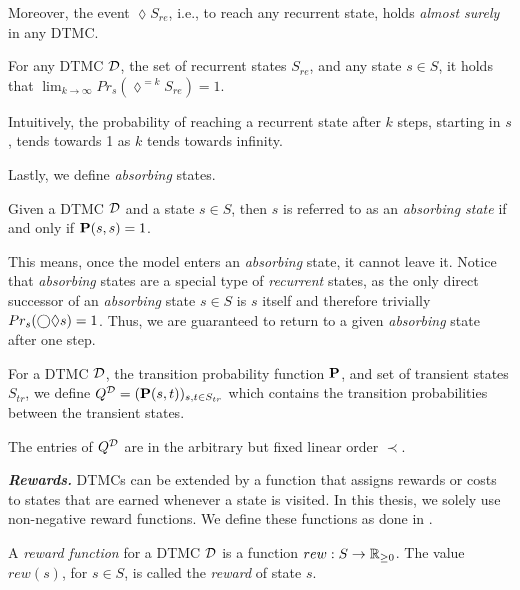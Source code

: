 Moreover, the event $\lozenge S_{re}$, i.e., to reach any recurrent state, holds \textit{almost surely} in any DTMC.

\begin{theorem}
    For any DTMC $\mathcal{D}$, the set of recurrent states $S_{re}$, and any state $s\in S$, it holds that $\lim_{k\rightarrow\infty}Pr_s(\lozenge^{=k} S_{re})=1$.
\end{theorem}
Intuitively, the probability of reaching a recurrent state after $k$ steps, starting in $s$, tends towards 1 as $k$ tends towards infinity.

Lastly, we define \textit{absorbing} states.
\begin{definition}
    Given a DTMC $\mathcal{D}$ and a state $s\in S$, then $s$ is referred to as an \textit{absorbing state} if and only if $\mathbf{P}(s,s) = 1$.
\end{definition}
This means, once the model enters an \textit{absorbing} state, it cannot leave it. Notice that \textit{absorbing} states are a special type of \textit{recurrent} states, as the only direct successor of an \textit{absorbing} state $s\in S$ is $s$ itself and therefore trivially $Pr_s(\bigcirc\lozenge s)=1$. Thus, we are guaranteed to return to a given \textit{absorbing} state after one step.

\begin{definition}\label{def:canonical_form}
    For a DTMC $\mathcal{D}$, the transition probability function $\mathbf{P}$, and set of transient states $S_{tr}$, we define $Q^{\mathcal{D}} = (\mathbf{P}(s,t))_{s,t\in S_{tr}}$ which contains the transition probabilities between the transient states.
\end{definition}
The entries of $Q^{\mathcal{D}}$ are in the arbitrary but fixed linear order $\prec$. 

\emph{\textbf{Rewards.}} DTMCs can be extended by a function that assigns rewards or costs to states that are earned whenever a state is visited. In this thesis, we solely use non-negative reward functions. We define these functions as done in \cite{Computing_EVTs_Stationary_Distr_in_MCs_Mertens}.

\begin{definition}
    A \textit{reward function} for a DTMC $\mathcal{D}$ is a function $rew: S\rightarrow\mathbb{R}_{\geq 0}$. The value $rew(s)$, for $s\in S$, is called the \textit{reward} of state $s$.
\end{definition}

